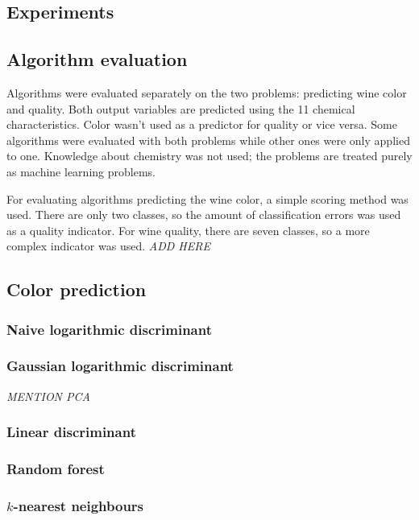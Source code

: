 \documentclass[twoside]{article}
\begin{document}
\begin{multicols}{2}
\section{Experiments}

\subsection{Algorithm evaluation}

Algorithms were evaluated separately on the two problems: predicting wine color and quality.
Both output variables are predicted using the 11 chemical characteristics. Color wasn't used
as a predictor for quality or vice versa.
Some algorithms were evaluated with both problems while other ones were only applied to one.
Knowledge about chemistry was not used; the problems are treated purely as machine learning
problems.

For evaluating algorithms predicting the wine color, a simple scoring method was used.
There are only two classes, so the amount of classification errors was used as a quality indicator.
For wine quality, there are seven classes, so a more complex indicator was used. \emph{ADD HERE}

\subsection{Color prediction}

\subsubsection{Naive logarithmic discriminant}

\subsubsection{Gaussian logarithmic discriminant}

\emph{MENTION PCA}

\subsubsection{Linear discriminant}

\subsubsection{Random forest}

\subsubsection{$k$-nearest neighbours}


\end{multicols}
\end{document}
